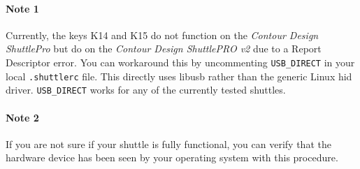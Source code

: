 \paragraph{Note 1} Currently, the keys K14 and K15 do not function on the \textit{Contour Design ShuttlePro} but do on the   \textit{Contour Design ShuttlePRO v2} due to a Report Descriptor error.  You can workaround this by uncommenting \texttt{USB\_DIRECT} in your local \texttt{.shuttlerc} file.  This directly uses libusb rather than the generic Linux hid driver.  \texttt{USB\_DIRECT} works for any of the currently tested shuttles. 
    
\paragraph{Note 2} If you are not sure if your shuttle is fully functional, you can verify that the hardware device has been seen by your operating system with this procedure.


